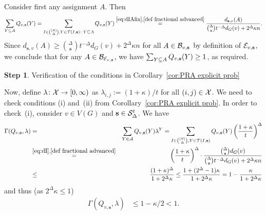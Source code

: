 \documentclass[10pt]{amsart}
\theoremstyle{definition}
\theoremstyle{claimstyle}
\theoremstyle{stepstyle}
\newtheorem{step}{Step}
\numberwithin{equation}{section}
\begin{document}
Consider first any assignment $A$.
Then
\begin{align*}
	\sum_{Y\subseteq A}Q_{v,\mathbf{s}}(Y)
	=\sum_{I\in \binom{[N]}{\Delta},Y\in \mathcal{T}(I,\mathbf{s})\colon Y\subseteq A} Q_{v,\mathbf{s}}(Y)
	\stackrel{\eqref{eq:dIAfix},\eqref{def fractional advanced}}{=}\frac{d_{\mathbf{s},v}(A)}{\binom{\Delta}{\mathbf{s}} t^{-\Delta} d_G (v) + 2^\Delta \kappa n}.
\end{align*}
Since $d_{\mathbf{s},v}(A) \ge \binom{\Delta}{\mathbf{s}} t^{-\Delta} d_G (v) + 2^\Delta \kappa n$ for all $A\in\mathcal{B}_{v,\mathbf{s}}$ by definition of $\mathcal{E}_{v,\mathbf{s}}$,
we conclude that for any $A\in \mathcal{B}_{\mathcal{E}_{v,\mathbf{s}}}$, we have $\sum_{Y\subseteq A}Q_{v,\mathbf{s}}(Y)\ge 1$, as required.


\begin{NoHyper}
\begin{step}
Verification of the conditions in Corollary~\ref{cor:PRA explicit prob}
\end{step}
\end{NoHyper}


Now, define $\lambda\colon \mathcal{X}\to [0,\infty)$ as $\lambda_{i,j}:=(1+\kappa)/t$ for all $(i,j)\in \mathcal{X}$. We need to check conditions (i) and~(ii) from Corollary~\ref{cor:PRA explicit prob}. In order to check~(i), consider $v\in V(G)$ and $\mathbf{s}\in \mathcal{S}_\Delta^t$. We have
\begin{eqnarray*}
\Gamma(Q_{v,\mathbf{s}},\lambda)&=& \sum_{Y\in \mathcal{A}}Q_{v,\mathbf{s}}(Y)\lambda^Y
=   \sum_{I\in \binom{[N]}{\Delta},Y\in \mathcal{T}(I,\mathbf{s})} Q_{v,\mathbf{s}}(Y)\left(\frac{1+\kappa}{t}\right)^\Delta  \\
&\overset{\eqref{eq:dI},\eqref{def fractional advanced}}{=}& \left(\frac{1+\kappa}{t}\right)^\Delta \cdot \frac{\binom{\Delta}{\mathbf{s}}d_G(v)}{\binom{\Delta}{\mathbf{s}} t^{-\Delta} d_G (v) + 2^\Delta \kappa n} \\
           &\le& \frac{(1+\kappa)^\Delta}{1+2^\Delta \kappa} 
           \le \frac{1+(2^\Delta-1) \kappa}{1+2^\Delta\kappa} 
           = 1-\frac{\kappa}{1+2^\Delta\kappa}
\end{eqnarray*}
and thus (as $2^\Delta \kappa \le 1 $)
\begin{align}
\Gamma(Q_{v,\mathbf{s}},\lambda)&\le 1-\kappa/2 <1.\label{1st gamma condition new}
\end{align}
\end{document}
